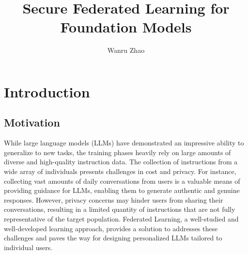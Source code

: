 \documentclass[withindex,glossary]{cam-thesis}
\title{Secure Federated Learning for Foundation Models}
\author{Wanru Zhao}
\begin{document}
\frontmatter{}



\chapter{Introduction}



\section{Motivation}

While large language models (LLMs) have demonstrated an impressive ability to generalize to new tasks, the training phases heavily rely on large amounts of diverse and high-quality instruction data. The collection of instructions from a wide array of individuals presents challenges in cost and privacy. For instance, collecting vast amounts of daily conversations from users is a valuable means of providing guidance for LLMs, enabling them to generate authentic and genuine responses. However, privacy concerns may hinder users from sharing their conversations, resulting in a limited quantity of instructions that are not fully representative of the target population. Federated Learning, a well-studied and well-developed learning approach, provides a solution to addresses these challenges and paves the way for designing personalized LLMs tailored to individual users.
\end{document}
